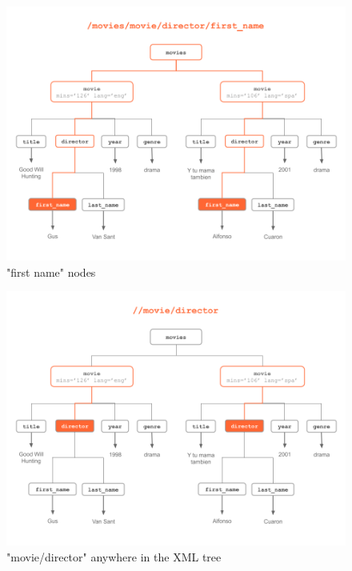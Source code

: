 \documentclass[
]{book}
\begin{document}
\begin{figure}

{\centering \includegraphics[width=0.85\linewidth]{images/xpath/xpath-example5} 

}

\caption{"first name" nodes}\label{fig:unnamed-chunk-55}
\end{figure}

\begin{figure}

{\centering \includegraphics[width=0.85\linewidth]{images/xpath/xpath-example6} 

}

\caption{"movie/director" anywhere in the XML tree}\label{fig:unnamed-chunk-56}
\end{figure}
\end{document}
